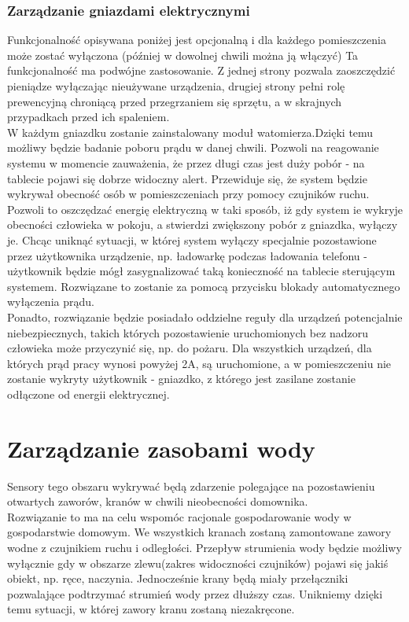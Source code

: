 \documentclass[12pt]{article} %
\begin{document}
\subsubsection{Zarządzanie gniazdami elektrycznymi}
Funkcjonalność opisywana poniżej jest opcjonalną i dla każdego pomieszczenia może zostać wyłączona (później w dowolnej chwili można ją włączyć) Ta funkcjonalność ma podwójne zastosowanie. Z jednej strony pozwala zaoszczędzić pieniądze wyłączając nieużywane urządzenia,  drugiej strony pełni rolę prewencyjną chroniącą przed przegrzaniem się sprzętu, a w skrajnych przypadkach przed ich spaleniem.
\\
W każdym gniazdku zostanie zainstalowany moduł watomierza.Dzięki temu możliwy będzie badanie poboru prądu w danej chwili. Pozwoli na reagowanie systemu w momencie zauważenia, że przez długi czas jest duży pobór - na tablecie pojawi się dobrze widoczny alert. Przewiduje się, że system będzie wykrywał obecność osób w pomieszczeniach przy pomocy czujników ruchu. Pozwoli to oszczędzać energię elektryczną w taki sposób, iż gdy system ie wykryje obecności człowieka w pokoju, a stwierdzi zwiększony pobór z gniazdka, wyłączy je. Chcąc uniknąć sytuacji, w której system wyłączy specjalnie pozostawione przez użytkownika urządzenie, np. ładowarkę podczas ładowania telefonu - użytkownik będzie mógł zasygnalizować taką konieczność na tablecie sterującym systemem. Rozwiązane to zostanie za pomocą przycisku blokady automatycznego wyłączenia prądu.
\\
Ponadto, rozwiązanie będzie posiadało oddzielne reguły dla urządzeń potencjalnie niebezpiecznych, takich których pozostawienie uruchomionych bez nadzoru człowieka może przyczynić się, np. do pożaru. Dla wszystkich urządzeń, dla których prąd pracy wynosi powyżej 2A, są uruchomione, a w pomieszczeniu nie zostanie wykryty użytkownik - gniazdko, z którego jest zasilane zostanie odłączone od energii elektrycznej.



\section{Zarządzanie zasobami wody}
Sensory tego obszaru wykrywać będą zdarzenie polegające na pozostawieniu otwartych zaworów, kranów w chwili nieobecności domownika. 
\\
Rozwiązanie to ma na celu wspomóc racjonale gospodarowanie wody w gospodarstwie domowym. We wszystkich kranach zostaną zamontowane zawory wodne z czujnikiem ruchu i odległości. Przepływ strumienia wody będzie możliwy wyłącznie gdy w obszarze zlewu(zakres widoczności czujników) pojawi się jakiś obiekt, np. ręce, naczynia. Jednocześnie krany będą miały przełączniki pozwalające podtrzymać strumień wody przez dłuższy czas. Unikniemy dzięki temu sytuacji, w której zawory kranu zostaną niezakręcone.
\end{document}
